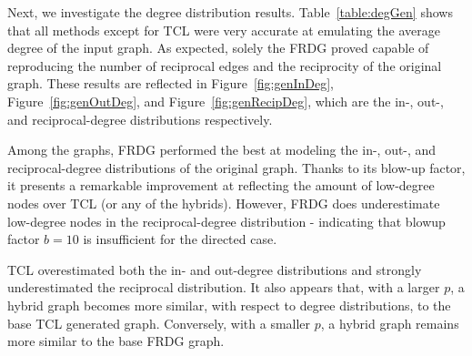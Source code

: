 \documentclass[pdftex,11pt,a4paper,twocolumn]{scrartcl}
\begin{document}
\begin{table}[h]
\centering
{}
\caption{A.C.C. of Generated Graphs}
\label{table:accGen}
\end{table}

Next, we investigate the degree distribution results. Table~\ref{table:degGen} shows that all methods except for TCL were very accurate at emulating the average degree of the input graph. As expected, solely the FRDG proved capable of reproducing the number of reciprocal edges and the reciprocity of the original graph. These results are reflected in Figure~\ref{fig:genInDeg}, Figure~\ref{fig:genOutDeg}, and Figure~\ref{fig:genRecipDeg}, which are the in-, out-, and reciprocal-degree distributions respectively. 

Among the graphs, FRDG performed the best at modeling the in-, out-, and reciprocal-degree distributions of the original graph. Thanks to its blow-up factor, it presents a remarkable improvement at reflecting the amount of low-degree nodes over TCL (or any of the hybrids). However, FRDG does underestimate low-degree nodes in the reciprocal-degree distribution - indicating that blowup factor $b=10$ is insufficient for the directed case. 

TCL overestimated both the in- and out-degree distributions and strongly underestimated the reciprocal distribution. It also appears that, with a larger $p$, a hybrid graph becomes more similar, with respect to degree distributions, to the base TCL generated graph. Conversely, with a smaller $p$, a hybrid graph remains more similar to the base FRDG graph.  
\end{document}
